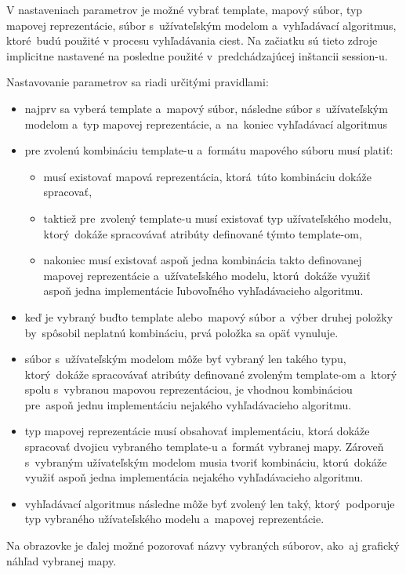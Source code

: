 \documentclass[12pt,a4paper]{report}
\begin{document}
V nastaveniach parametrov je možné vybrať template, mapový súbor, typ mapovej reprezentácie, súbor s~užívateľským modelom a~vyhľadávací algoritmus, ktoré~budú použité v procesu vyhľadávania ciest. Na začiatku sú tieto zdroje implicitne nastavené na posledne použité v~predchádzajúcej inštancii session-u.

Nastavovanie parametrov sa riadi určitými pravidlami:
\begin{itemize}
    \item najprv sa vyberá template a~mapový súbor, následne súbor s~užívateľským modelom a~typ mapovej reprezentácie, a~na~koniec vyhľadávací algoritmus
    \item pre zvolenú kombináciu template-u a~formátu mapového súboru musí platiť:
    \begin{itemize}
        \item musí existovať mapová reprezentácia, ktorá~túto kombináciu dokáže spracovať,
        \item taktiež pre~zvolený template-u musí existovať typ užívateľského modelu, ktorý~dokáže spracovávať atribúty definované týmto template-om,
        \item nakoniec musí existovať aspoň jedna kombinácia takto definovanej mapovej reprezentácie a~užívateľského modelu, ktorú~dokáže využiť aspoň jedna implementácie ľubovoľného vyhľadávacieho algoritmu.
    \end{itemize}
    \item keď je vybraný buďto template alebo~mapový súbor a~výber druhej položky by~spôsobil neplatnú kombináciu, prvá položka sa opäť vynuluje.
    \item súbor s~užívateľským modelom môže byť vybraný len takého typu, ktorý~dokáže spracovávať atribúty definované zvoleným template-om a~ktorý spolu s~vybranou mapovou reprezentáciou, je vhodnou kombináciou pre~aspoň jednu implementáciu nejakého vyhľadávacieho algoritmu.
    \item typ mapovej reprezentácie musí obsahovať implementáciu, ktorá dokáže spracovať dvojicu vybraného template-u a~formát vybranej mapy. Zároveň s~vybraným užívateľským modelom musia tvoriť kombináciu, ktorú~dokáže využiť aspoň jedna implementácia nejakého vyhľadávacieho algoritmu.
    \item vyhľadávací algoritmus následne môže byť zvolený len taký, ktorý~podporuje typ vybraného užívateľského modelu a~mapovej reprezentácie.
\end{itemize}

Na obrazovke je ďalej možné pozorovať názvy vybraných súborov, ako~aj grafický náhľad vybranej mapy.
\end{document}
